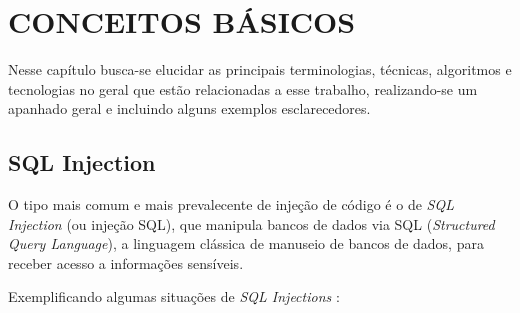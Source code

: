\chapter{CONCEITOS BÁSICOS\textbf{}}
\label{chp:capitulo2}

Nesse capítulo busca-se elucidar as principais terminologias, técnicas, algoritmos e tecnologias no geral que estão relacionadas a esse trabalho, realizando-se um apanhado geral e incluindo alguns exemplos esclarecedores.

\section{SQL Injection}

O tipo mais comum e mais prevalecente de injeção de código é o de \textit{SQL Injection} (ou injeção SQL), que manipula bancos de dados via SQL (\textit{Structured Query Language}), a linguagem clássica de manuseio de bancos de dados, para receber acesso a informações sensíveis.

Exemplificando algumas situações de \textit{SQL Injections} \cite{sql_port_swigger}:

